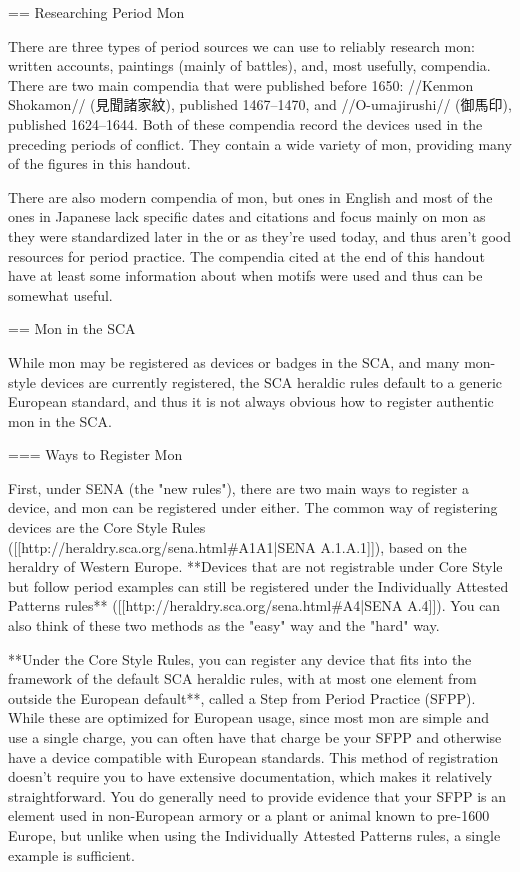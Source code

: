   == Researching Period Mon

  There are three types of period sources we can use to reliably research
  mon: written accounts, paintings (mainly of battles), and, most
  usefully, compendia.
  There are two main compendia that were published before 1650:
  //Kenmon Shokamon// (見聞諸家紋), published 1467--1470, and 
  //O-umajirushi// (御馬印), published 1624--1644.  Both of these compendia
  record the devices used in the preceding periods of conflict. They contain
  a wide variety of mon, providing many of the figures in this handout.

  There are also modern compendia of mon, but ones in English and most
  of the ones in Japanese lack specific dates and citations and focus
  mainly on mon as they were standardized later in the \EdoPeriod or
  as they're used today, and thus aren't good resources for period
  practice.  The compendia cited at the end of this handout have at least
  some information about when motifs were used and thus can be somewhat
  useful.

  == Mon in the SCA

  While mon may be registered as devices or badges in the SCA, and
  many mon-style devices are currently registered, the SCA heraldic
  rules default to a generic European standard, and thus it is not
  always obvious how to register authentic mon in the SCA.

  === Ways to Register Mon

  First, under SENA (the "new rules"), there are two main ways to
  register a device, and mon can be registered under either.  The
  common way of registering devices are the Core Style Rules 
  ([[http://heraldry.sca.org/sena.html#A1A1|SENA A.1.A.1]]), based on
  the heraldry of Western Europe.  **Devices that are not registrable
  under Core Style but follow period examples can still be registered
  under the Individually Attested Patterns rules**
  ([[http://heraldry.sca.org/sena.html#A4|SENA A.4]]).  You can also
  think of these two methods as the "easy" way and the "hard" way.

  **Under the Core Style Rules, you can register any device that fits
  into the framework of the default SCA heraldic rules, with at most
  one element from outside the European default**, called a Step from
  Period Practice (SFPP).  While these are optimized for European
  usage, since most mon are simple and use a single charge, you can
  often have that charge be your SFPP and otherwise have a device
  compatible with European standards.  This method of registration
  doesn't require you to have extensive documentation, which makes it
  relatively straightforward.  You do generally need to provide
  evidence that your SFPP is an element used in non-European armory or
  a plant or animal known to pre-1600 Europe, but unlike when using
  the Individually Attested Patterns rules, a single example is
  sufficient.

